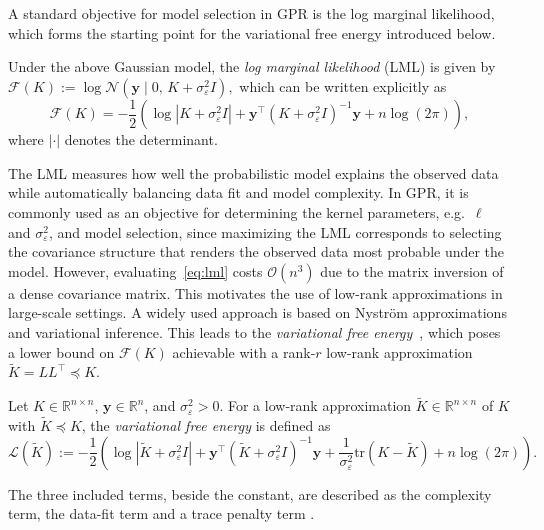 \documentclass[onefignum,onetabnum]{siamart250211}
\newcommand{\R}{\mathbb{R}}
\newcommand{\tr}{\mathrm{tr}}
\begin{document}
A standard objective for model selection in GPR is the log marginal likelihood, which forms the starting point for the variational free energy introduced below.
\begin{definition}
    Under the above Gaussian model, the \emph{log marginal likelihood} (LML) is given by
    $\mathcal{F}(K):=\log \mathcal{N}(\bm y \mid 0,\, K + \sigma_\varepsilon^2 I),$
    which can be written explicitly as
    \begin{equation}
        \label{eq:lml}
        \mathcal{F}(K)
        =
        -\frac12
        \left(
        \log |K+\sigma_\varepsilon^2 I|
        +
        \bm y^\top (K+\sigma_\varepsilon^2 I)^{-1}\bm y
        +
        n\log(2\pi)
        \right),
    \end{equation}
where $|\cdot|$ denotes the determinant.
\end{definition}
The LML measures how well the probabilistic model explains the observed data while automatically balancing data fit and model complexity. In GPR, it is commonly used as an objective for determining the kernel parameters, e.g.~$\ell$ and $\sigma_\varepsilon^2$, and model selection, since maximizing the LML corresponds to selecting the covariance structure that renders the observed data most probable under the model. However, evaluating~\eqref{eq:lml} costs $\mathcal{O}(n^3)$ due to the matrix inversion of a dense covariance matrix. This motivates the use of low-rank approximations in large-scale settings. 
A widely used approach is based on Nystr\"om approximations and variational inference. This leads to the \emph{variational free energy}~\cite{Titsias.2009}, which poses a lower bound on $\mathcal{F}(K)$ achievable with a rank-$r$ low-rank approximation  $\widetilde{K} = LL^\top \preceq K$.
\begin{definition}
    Let $K \in \R^{n\times n}$, $\bm{y} \in \mathbb{R}^n$, and $\sigma_\varepsilon^2 > 0$. For a low-rank approximation $\widetilde{K} \in \R^{n\times n}$ of $K$ with $\widetilde{K} \preceq K$, the \emph{variational free energy} is defined as
    \begin{equation}
        \label{eq:vfe}
        \mathcal{L}(\widetilde{K})
        :=
        -\frac{1}{2}\left(
        \log|\widetilde{K}+\sigma_\varepsilon^2 I|
        + \bm{y}^\top(\widetilde{K}+\sigma_\varepsilon^2 I)^{-1}\bm{y}
        + \frac{1}{\sigma_\varepsilon^2}\tr(K-\widetilde{K})
        + n\log(2\pi)
        \right).
    \end{equation}
\end{definition}
The three included terms, beside the constant, are described as the complexity term, the data-fit term and a trace penalty term \cite{vanderwilk.2019}. 
\end{document}
